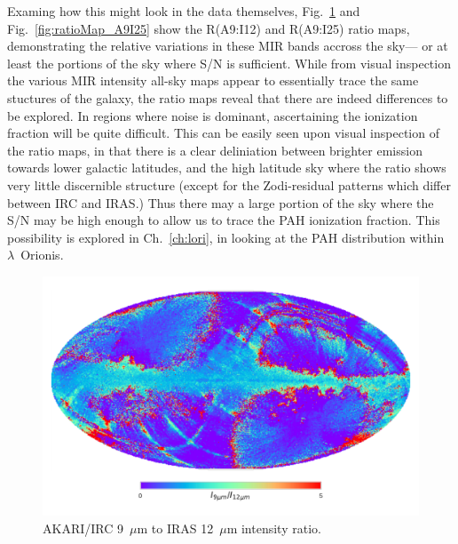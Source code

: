          Examing how this might look in the data themselves, Fig.~\ref{fig:ratioMap_A9I12} and Fig.~\ref{fig:ratioMap_A9I25} show the R(A9:I12) and R(A9:I25) ratio maps, demonstrating the relative variations in these MIR bands accross the sky--- or at least the portions of the sky where S/N is sufficient. While from visual inspection the various MIR intensity all-sky maps appear to essentially trace the same stuctures of the galaxy, the ratio maps reveal that there are indeed differences to be explored.  In regions where noise is dominant, ascertaining the ionization fraction will be quite difficult. This can be easily seen upon visual inspection of the ratio maps, in that there is a clear deliniation between brighter emission towards lower galactic latitudes, and the high latitude sky where the ratio shows very little discernible structure (except for the Zodi-residual patterns which differ between IRC and IRAS.) Thus there may a large portion of the sky where the S/N may be high enough to allow us to trace the PAH ionization fraction. This possibility is explored in Ch.~\ref{ch:lori}, in looking at the PAH distribution within $\lambda$~Orionis.
             \begin{figure}
               \centering
               \includegraphics[width=\textwidth]{../Plots/ch_datasources/ratioMap_A9I12.pdf}
               \caption{ AKARI/IRC 9~$\mu$m to IRAS 12~$\mu$m intensity ratio.}
               \label{fig:ratioMap_A9I12}
             \end{figure}

